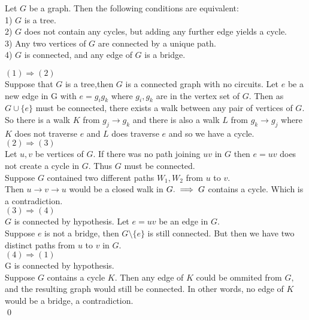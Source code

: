 \documentclass[../main.tex]{subfiles}
\begin{document}
 \begin{lem}\cite{jungnickel}
 Let $G$ be a graph. Then the following conditions are equivalent:\\
 1) $G$ is a tree.\\
 2) $G$ does not contain any cycles, but adding any further edge yields a cycle.\\
 3) Any two vertices of $G$ are connected by a unique path.\\
 4) $G$ is connected, and any edge of $G$ is a bridge.
 \end{lem}
 
 \noindent\Proof $(1) \Longrightarrow (2)$\\
 \noindent Suppose that $G$ is a tree,then $G$ is a connected graph with no circuits. Let $e$ be a new edge in G with $e = g_ig_k$ where $g_i,g_k$ are in the vertex set of $G.$ Then as $G \cup \{e\}$ must be connected, there exists a walk between any pair of vertices of $G$. So there is a walk $K$ from $g_j \rightarrow g_k$ and there is also a walk $L$ from $g_k \rightarrow g_j$ where $K$ does not traverse $e$ and $L$ does traverse $e$ and so we have a cycle.\\

\noindent\Proof $(2) \Longrightarrow (3)$\\
\noindent Let $u,v$ be vertices of $G.$ If there was no path joining $uv$ in $G$ then $e = uv$ does not create a cycle in $G.$ Thus $G$ must be connected.\\
\noindent Suppose $G$ contained two different paths $W_1, W_2$ from $u$ to $v.$\\
\noindent Then $ u \longrightarrow v \longrightarrow u$ would be a closed walk in $G. \\ \implies G$ contains a cycle. Which is a contradiction.\\

\noindent\Proof $(3) \Longrightarrow (4)$\\
\noindent $G$ is connected by hypothesis. Let $e = uv$ be an edge in $G.$\\
\noindent Suppose $e$ is not a bridge, then $G \setminus \{e\}$ is still connected. But then we have two distinct paths from $u$ to $v$ in $G.$\\

\noindent\Proof $(4) \Longrightarrow (1)$\\
\noindent G is connected by hypothesis.\\
\noindent Suppose $G$ contains a cycle $K.$ Then any edge of $K$ could be ommited from $G,$ and the resulting graph would still be connected. In other words, no edge of $K$ would be a bridge, a contradiction.\\
\qed
\end{document}
